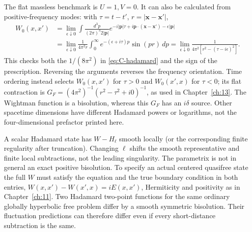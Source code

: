 The flat massless benchmark is $U=1,V=0$. It can also be calculated from
positive-frequency modes: with $\tau=t-t'$, $r=|\mathbf x-\mathbf x'|$,
\begin{align*}
 W_0(x,x')&=\lim_{\epsilon\downarrow0}
 \int\frac{d^3p}{(2\pi)^3 2|\mathbf p|}
 e^{-i|\mathbf p|\tau+i\mathbf p\cdot(\mathbf x-\mathbf x')-\epsilon|\mathbf p|}\\
 &=\lim_{\epsilon\downarrow0}\frac{1}{4\pi^2 r}
       \int_0^\infty e^{-(\epsilon+i\tau)p}\sin(pr)\,dp
 =\lim_{\epsilon\downarrow0}\frac{1}{4\pi^2[r^2-(\tau-i\epsilon)^2]} .
\end{align*}
This checks both the $1/(8\pi^2)$ in \eqref{eq:C-hadamard} and the sign of
the prescription. Reversing the arguments reverses the frequency
orientation. Time ordering instead selects $W_0(x,x')$ for $\tau>0$ and
$W_0(x',x)$ for $\tau<0$; its flat contraction is
$G_F=(4\pi^2)^{-1}(r^2-\tau^2+i0)^{-1}$, as used in
Chapter~\ref{ch:13}. The Wightman function is a bisolution, whereas this
$G_F$ has an $i\delta$ source. Other spacetime dimensions have different
Hadamard powers or logarithms, not the four-dimensional prefactor printed
here.

A scalar Hadamard state has $W-H_\ell$ smooth locally (or the corresponding
finite regularity after truncation). Changing $\ell$ shifts the smooth
representative and finite local subtractions, not the leading singularity.
The parametrix is not in general an exact positive bisolution.
To specify an actual centered quasifree state the full $W$ must satisfy
the equation and the true boundary condition in both entries,
$W(x,x')-W(x',x)=iE(x,x')$, Hermiticity and positivity as in
Chapter~\ref{ch:11}. Two Hadamard two-point functions for the same ordinary
globally hyperbolic free problem differ by a smooth symmetric bisolution.
Their fluctuation predictions can therefore differ even if every
short-distance subtraction is the same.


